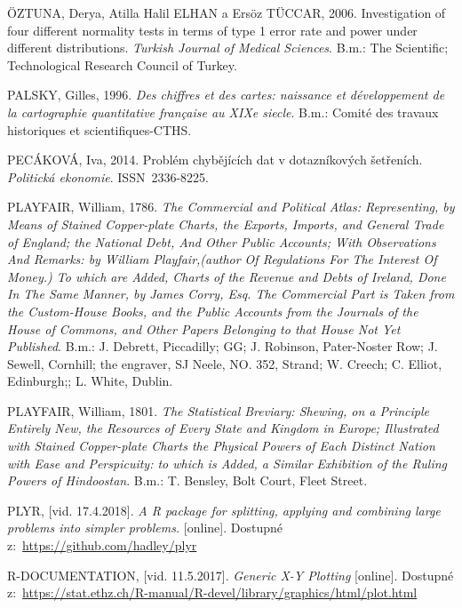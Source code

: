 \documentclass[12pt,]{article}
\begin{document}
\hypertarget{ref-normality_tests}{}
ÖZTUNA, Derya, Atilla Halil ELHAN a Ersöz TÜCCAR, 2006. Investigation of
four different normality tests in terms of type 1 error rate and power
under different distributions. \emph{Turkish Journal of Medical
Sciences}. B.m.: The Scientific; Technological Research Council of
Turkey.

\hypertarget{ref-palsky1996}{}
PALSKY, Gilles, 1996. \emph{Des chiffres et des cartes: naissance et
développement de la cartographie quantitative française au XIXe siecle}.
B.m.: Comité des travaux historiques et scientifiques-CTHS.

\hypertarget{ref-pecakova}{}
PECÁKOVÁ, Iva, 2014. Problém chybějících dat v dotazníkových šetřeních.
\emph{Politická ekonomie}. ISSN~2336-8225.

\hypertarget{ref-playfair1786}{}
PLAYFAIR, William, 1786. \emph{The Commercial and Political Atlas:
Representing, by Means of Stained Copper-plate Charts, the Exports,
Imports, and General Trade of England; the National Debt, And Other
Public Accounts; With Observations And Remarks: by William
Playfair,(author Of Regulations For The Interest Of Money.) To which are
Added, Charts of the Revenue and Debts of Ireland, Done In The Same
Manner, by James Corry, Esq. The Commercial Part is Taken from the
Custom-House Books, and the Public Accounts from the Journals of the
House of Commons, and Other Papers Belonging to that House Not Yet
Published}. B.m.: J. Debrett, Piccadilly; GG; J. Robinson, Pater-Noster
Row; J. Sewell, Cornhill; the engraver, SJ Neele, NO. 352, Strand; W.
Creech; C. Elliot, Edinburgh;; L. White, Dublin.

\hypertarget{ref-playfair1801}{}
PLAYFAIR, William, 1801. \emph{The Statistical Breviary: Shewing, on a
Principle Entirely New, the Resources of Every State and Kingdom in
Europe; Illustrated with Stained Copper-plate Charts the Physical Powers
of Each Distinct Nation with Ease and Perspicuity: to which is Added, a
Similar Exhibition of the Ruling Powers of Hindoostan}. B.m.: T.
Bensley, Bolt Court, Fleet Street.

\hypertarget{ref-plyr}{}
PLYR, {[}vid. 17.4.2018{]}. \emph{A R package for splitting, applying
and combining large problems into simpler problems.} {[}online{]}.
Dostupné z:~\url{https://github.com/hadley/plyr}

\hypertarget{ref-plot}{}
R-DOCUMENTATION, {[}vid. 11.5.2017{]}. \emph{Generic X-Y Plotting}
{[}online{]}. Dostupné
z:~\url{https://stat.ethz.ch/R-manual/R-devel/library/graphics/html/plot.html}
\end{document}
